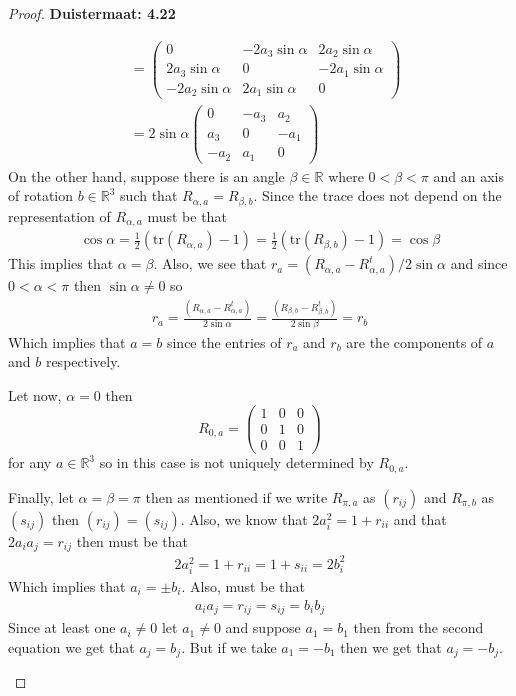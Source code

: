 \documentclass[11pt]{article}
\newcommand{\R}{\mathbb{R}}
\newcommand{\tr}{\text{tr}}
\theoremstyle{definition}
\begin{document}
\begin{proof}{\textbf{Duistermaat: 4.22}}
\begin{itemize}
\begin{align*}
        &= \begin{pmatrix}
            0
            & -2a_3\sin\alpha
            & 2a_2\sin\alpha \\
            2a_3\sin\alpha
            & 0
            & -2a_1\sin\alpha \\
            -2a_2\sin\alpha
            & 2a_1\sin\alpha
            & 0
        \end{pmatrix}\\
        &= 2\sin\alpha\begin{pmatrix}
            0 & -a_3 & a_2 \\
            a_3 & 0 & -a_1 \\
            -a_2 & a_1 & 0
        \end{pmatrix}
    \end{align*}
    On the other hand, suppose there is an angle $\beta \in \R$ where
    $0 < \beta < \pi$ and an axis of rotation $b \in \R^3$ such that
    $R_{\alpha, a} = R_{\beta, b}$.
    Since the trace does not depend on the representation of
    $R_{\alpha, a}$ must be that
    \begin{align*}
        \cos\alpha = \frac{1}{2}(\tr(R_{\alpha, a}) - 1)
        = \frac{1}{2}(\tr(R_{\beta, b}) - 1) = \cos\beta
    \end{align*} 
    This implies that $\alpha = \beta$.
    Also, we see that $r_a = (R_{\alpha, a} - R_{\alpha, a}^t)/2\sin\alpha$
    and since $0<\alpha < \pi$ then $\sin\alpha \neq 0$ so
    \begin{align*}
        r_a = \frac{(R_{\alpha, a} - R_{\alpha, a}^t)}{2\sin\alpha}
        = \frac{(R_{\beta, b} - R_{\beta, b}^t)}{2\sin\beta} = r_b
    \end{align*}
    Which implies that $a = b$ since the entries of $r_a$ and $r_b$ are the 
    components of $a$ and $b$ respectively.
    
    Let now, $\alpha = 0$ then
    $$R_{0, a} = \begin{pmatrix}
        1 & 0 & 0\\ 0 & 1 & 0\\ 0 & 0 & 1
    \end{pmatrix}$$
    for any $a \in \R^3$ so in this case is not uniquely determined by
    $R_{0, a}$.

    Finally, let $\alpha = \beta =\pi$ then as mentioned if we write $R_{\pi, a}$ as
    $(r_{ij})$ and $R_{\pi, b}$ as $(s_{ij})$ then $(r_{ij}) = (s_{ij})$.
    Also, we know that $2a_i^2 = 1 + r_{ii}$ and that $2a_ia_j = r_{ij}$
    then must be that
    \begin{align*}
        2a_i^2 = 1 + r_{ii} = 1 + s_{ii} = 2b_i^2  
    \end{align*}
    Which implies that $a_i = \pm b_i$. Also, must be that
    \begin{align*}
        a_ia_j = r_{ij} = s_{ij} = b_ib_j
    \end{align*}
    Since at least one $a_i\neq 0$ let $a_1 \neq 0$ and suppose $a_1 = b_1$
    then from the second equation we get that $a_j = b_j$.
    But if we take $a_1 = -b_1$ then we get that $a_j = -b_j$.


\end{itemize}
\end{proof}
\end{document}
